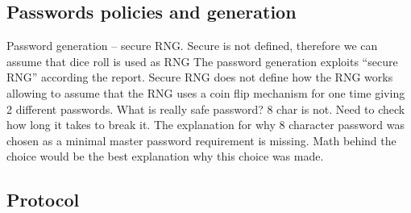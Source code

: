 \documentclass[10pt]{article}
\begin{document}
\subsection{Passwords policies and generation}
\label{sub:Passwords policies and generation}

Password generation – secure RNG. Secure is not defined, therefore we can assume that dice roll is used as RNG
The password generation exploits “secure RNG” according the report. Secure RNG does not define how the RNG works allowing to assume that the RNG uses a coin flip mechanism for one time giving 2 different passwords.
What is really safe password? 8 char is not. Need to check how long it takes to break it.
The explanation for  why 8 character password was chosen as a minimal master password requirement is missing. Math behind the choice would be the best explanation why this choice was made.

\subsection{Protocol}
\label{sub:Protocol}
\end{document}
